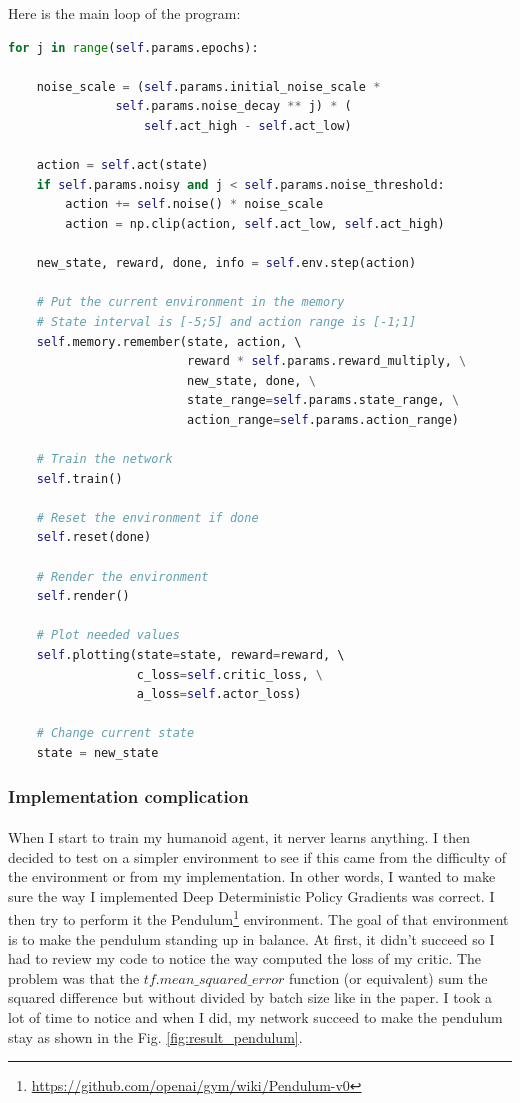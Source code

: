 \documentclass{article}
\begin{document}
Here is the main loop of the program:

\begin{lstlisting}[language=Python]
for j in range(self.params.epochs):

    noise_scale = (self.params.initial_noise_scale *
               self.params.noise_decay ** j) * (
                   self.act_high - self.act_low)

    action = self.act(state)
    if self.params.noisy and j < self.params.noise_threshold:
        action += self.noise() * noise_scale
        action = np.clip(action, self.act_low, self.act_high)

    new_state, reward, done, info = self.env.step(action)

    # Put the current environment in the memory
    # State interval is [-5;5] and action range is [-1;1]
    self.memory.remember(state, action, \ 
                         reward * self.params.reward_multiply, \
                         new_state, done, \
                         state_range=self.params.state_range, \
                         action_range=self.params.action_range)

    # Train the network
    self.train()

    # Reset the environment if done
    self.reset(done)

    # Render the environment
    self.render()

    # Plot needed values
    self.plotting(state=state, reward=reward, \ 
                  c_loss=self.critic_loss, \
                  a_loss=self.actor_loss)

    # Change current state
    state = new_state
\end{lstlisting}


\subsubsection{Implementation complication}

\paragraph{}
When I start to train my humanoid agent, it nerver learns anything. I then
decided to test on a simpler environment to see if this came from the difficulty
of the environment or from my implementation. In other words, I wanted to make
sure the way I implemented Deep Deterministic Policy Gradients was correct. I
then try to perform it the
Pendulum\footnote{\url{https://github.com/openai/gym/wiki/Pendulum-v0}}
environment. The goal of that environment is to make the pendulum standing up in
balance. At first, it didn't succeed so I had to review my code to notice the
way computed the loss of my critic. The problem was that the
$tf.mean\_squared\_error$ function (or equivalent) sum the squared difference
but without divided by batch size like in the paper. I took a lot of time to
notice and when I did, my network succeed to make the pendulum stay as shown in
the Fig. \ref{fig:result_pendulum}.
\end{document}
